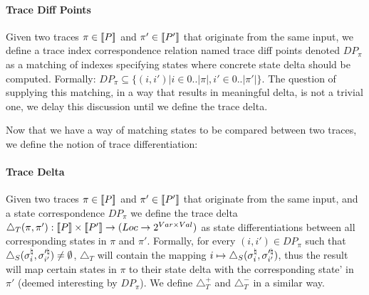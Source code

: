 \paragraph{Trace Diff Points} 
Given two traces $\pi \in \lbrack\!\lbrack P \rbrack\!\rbrack$ and $\pi' \in \lbrack\!\lbrack P' \rbrack\!\rbrack$ that originate from the same input, we define a trace index correspondence relation named trace diff points denoted $DP_{\pi}$ as a matching of indexes specifying states where concrete state delta should be computed. Formally: $DP_{\pi} \subseteq \{(i,i')|i \in {0..|\pi|}, i' \in {0..|\pi'|}\}$. The question of supplying this matching, in a way that results in meaningful delta, is not a trivial one, we delay this discussion until we define the trace delta.

Now that we have a way of matching states to be compared between two traces, we define the notion of trace differentiation:

\paragraph{Trace Delta} 
Given two traces $\pi \in \lbrack\!\lbrack P \rbrack\!\rbrack$ and $\pi' \in \lbrack\!\lbrack P' \rbrack\!\rbrack$ that originate from the same input, and a state correspondence $DP_{\pi}$ we define the trace delta $\triangle_{T}(\pi,\pi') : \lbrack\!\lbrack P \rbrack\!\rbrack \times \lbrack\!\lbrack P' \rbrack\!\rbrack \rightarrow (Loc \rightarrow 2^{Var \times Val})$ as state differentiations between all corresponding states in $\pi$ and $\pi'$. Formally, for every $(i,i') \in DP_{\pi}$ such that $\triangle_{S}(\sigma^\natural_{i},\sigma'^\natural_{i'}) \neq \emptyset$, $\triangle_{T}$ will contain the mapping $i \mapsto \triangle_{S}(\sigma^\natural_{i},\sigma'^\natural_{i'})$, thus the result will map certain states in $\pi$ to their state delta with the corresponding state' in $\pi'$ (deemed interesting by $DP_{\pi}$). We define $\triangle_{T}^{+}$ and $\triangle_{T}^{-}$ in a similar way.


